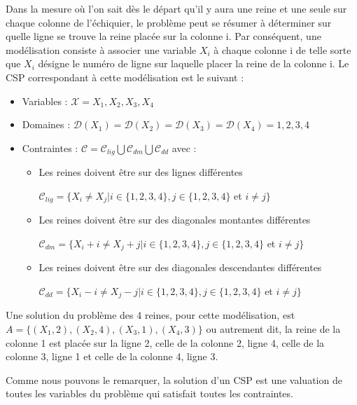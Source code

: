 Dans la mesure où l'on sait dès le départ qu'il y aura une reine et une seule sur chaque colonne de l'échiquier, le problème peut se résumer à déterminer sur quelle ligne se trouve la reine placée sur la colonne i. Par conséquent, une modélisation consiste à associer une variable $X_i$ à chaque colonne i de telle sorte que $X_i$ désigne le numéro de ligne sur laquelle placer la reine de la colonne i. Le CSP correspondant à cette modélisation est le suivant : 
\begin{itemize}
	\item Variables : $\mathcal{X} = {X_1,X_2,X_3,X_4}$
	
	\item Domaines : $\mathcal{D}(X_1) = \mathcal{D}(X_2) = \mathcal{D}(X_3) = \mathcal{D}(X_4) = {1,2,3,4}$
	
	\item Contraintes : $\mathcal{C} = \mathcal{C}_{lig} \bigcup \mathcal{C}_{dm} \bigcup \mathcal{C}_{dd}$ avec : 
	\begin{itemize}
		\item Les reines doivent être sur des lignes différentes
		\begin{center}
			$ \mathcal{C}_{lig} = \{X_i \neq X_j \vert i \in \{1,2,3,4\}, j \in \{1,2,3,4\} $ et $ i \neq j\} $
		\end{center} 
		
		\item Les reines doivent être sur des diagonales montantes différentes 
		\begin{center}
			$\mathcal{C}_{dm} = \{X_i+i \neq X_j+j | i \in \{1,2,3,4\}, j \in \{1,2,3,4\}$ et $i \neq j\}$
		\end{center}
		
		\item Les reines doivent être sur des diagonales descendantes différentes 
		\begin{center}
			$\mathcal{C}_{dd} = \{X_i-i \neq X_j-j | i \in \{1,2,3,4\}, j \in \{1,2,3,4\}$ et $i \neq j\}$
		\end{center}
	\end{itemize}
\end{itemize}

Une solution du problème des 4 reines, pour cette modélisation, est $A = \{(X_1,2), (X_2,4), (X_3,1), (X_4,3)\}$ ou autrement dit, la reine de la colonne 1 est placée sur la ligne 2, celle de la colonne 2, ligne 4, celle de la colonne 3, ligne 1 et celle de la colonne 4, ligne 3. 

Comme nous pouvons le remarquer, la solution d'un CSP est une valuation de toutes les variables du problème qui satisfait toutes les contraintes.
\noindent
{} 
	\vspace{-1.2cm}
